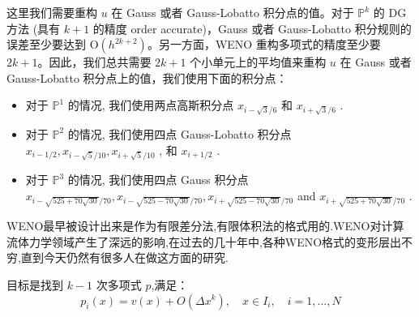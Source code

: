 \documentclass{book}
\begin{document}
这里我们需要重构 $u$ 在 Gauss 或者 Gauss-Lobatto 积分点的值。对于 $\mathbb{P}^{k}$ 的 DG 方法 (具有 $k+1$ 的精度 order accurate)，Gauss 或者 Gauss-Lobatto 积分规则的误差至少要达到 $\mathrm{O}\left(h^{2 k+2}\right)$。另一方面，WENO 重构多项式的精度至少要 $2 k+1$。因此，我们总共需要 $2k+1$ 个小单元上的平均值来重构 $u$ 在 Gauss 或者 Gauss-Lobatto 积分点上的值，我们使用下面的积分点：

\begin{itemize}
  \item 对于  $\mathbb{P}^{1}$  的情况, 我们使用两点高斯积分点  $x_{i-\sqrt{3} / 6}$  和  $x_{i+\sqrt{3} / 6}$ .
  \item 对于  $\mathbb{P}^{2}$  的情况, 我们使用四点 Gauss-Lobatto 积分点  $x_{i-1 / 2}, x_{i-\sqrt{5} / 10}, x_{i+\sqrt{5} / 10}$ , 和  $x_{i+1 / 2}$ .
  \item 对于  $\mathbb{P}^{3}$  的情况, 我们使用四点 Gauss 积分点  $x_{i-\sqrt{525+70 \sqrt{30}} / 70}, x_{i-\sqrt{525-70 \sqrt{30}} / 70}, x_{i+\sqrt{525-70 \sqrt{30}} / 70}$  and  $x_{i+\sqrt{525+70 \sqrt{30}} / 70}$ .
\end{itemize}

WENO最早被设计出来是作为有限差分法,有限体积法的格式用的.WENO对计算流体力学领域产生了深远的影响,在过去的几十年中,各种WENO格式的变形层出不穷,直到今天仍然有很多人在做这方面的研究.

目标是找到 $k-1$ 次多项式 $p$,满足：
\begin{equation}
  p_{i}(x)=v(x)+O\left(\Delta x^{k}\right), \quad x \in I_{i}, \quad i=1, \ldots, N
\end{equation}
\end{document}
